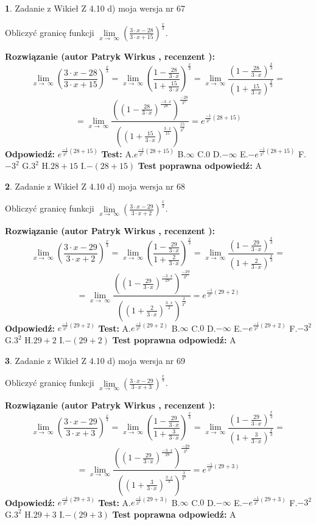 \documentclass[12pt, a4paper]{article}
\theoremstyle{definition} %
\newtheorem{zad}{}
\newcommand{\zadStart}[1]{\begin{zad}#1\newline}
\newcommand{\zadStop}{\end{zad}}
\newcommand{\rozwStart}[2]{\noindent \textbf{Rozwiązanie (autor #1 , recenzent #2): }\newline}
\newcommand{\rozwStop}{\newline}
\newcommand{\odpStart}{\noindent \textbf{Odpowiedź:}\newline}
\newcommand{\odpStop}{\newline}
\newcommand{\testStart}{\noindent \textbf{Test:}\newline}
\newcommand{\testStop}{\newline}
\newcommand{\kluczStart}{\noindent \textbf{Test poprawna odpowiedź:}\newline}
\newcommand{\kluczStop}{\newline}
\begin{document}
\zadStart{Zadanie z Wikieł Z 4.10 d) moja wersja nr 67}


Obliczyć granicę funkcji  $\lim\limits_{x\to\ \infty}(\frac{3\cdot x-28}{3\cdot x+15})^{\frac{x}{3}}$.
\zadStop
\rozwStart{Patryk Wirkus}{}
$$\lim\limits_{x\to\ \infty}(\frac{3\cdot x-28}{3\cdot x+15})^{\frac{x}{3}} = \lim\limits_{x\to\ \infty}(\frac{1-\frac{28}{3\cdot x}}{1+\frac{15}{3\cdot x}})^{\frac{x}{3}}=\lim\limits_{x\to\ \infty}\frac{(1-\frac{28}{3\cdot x})^{\frac{x}{3}}}{(1+\frac{15}{3\cdot x})^{\frac{x}{3}}}=$$
$$=\lim\limits_{x\to\ \infty}\frac{((1-\frac{28}{3\cdot x})^{\frac{-3\cdot x}{28}})^{\frac{-28}{3^{2}}}}{((1+\frac{15}{3\cdot x})^{\frac{3\cdot x}{15}})^{\frac{15}{3^{2}}}}=e^{\frac{-1}{3^{2}}(28+15)}$$
\rozwStop
\odpStart
$e^{\frac{-1}{3^{2}}(28+15)}$
\odpStop
\testStart
A.$e^{\frac{-1}{3^{2}}(28+15)}$ B.$\infty$ C.$0$ D.$-\infty$ E.$-e^{\frac{-1}{3^{2}}(28+15)}$
F.$-3^{2}$ G.$3^{2}$
H.$28+15$
I.$-(28+15)$
\testStop
\kluczStart
A
\kluczStop



\zadStart{Zadanie z Wikieł Z 4.10 d) moja wersja nr 68}


Obliczyć granicę funkcji  $\lim\limits_{x\to\ \infty}(\frac{3\cdot x-29}{3\cdot x+2})^{\frac{x}{3}}$.
\zadStop
\rozwStart{Patryk Wirkus}{}
$$\lim\limits_{x\to\ \infty}(\frac{3\cdot x-29}{3\cdot x+2})^{\frac{x}{3}} = \lim\limits_{x\to\ \infty}(\frac{1-\frac{29}{3\cdot x}}{1+\frac{2}{3\cdot x}})^{\frac{x}{3}}=\lim\limits_{x\to\ \infty}\frac{(1-\frac{29}{3\cdot x})^{\frac{x}{3}}}{(1+\frac{2}{3\cdot x})^{\frac{x}{3}}}=$$
$$=\lim\limits_{x\to\ \infty}\frac{((1-\frac{29}{3\cdot x})^{\frac{-3\cdot x}{29}})^{\frac{-29}{3^{2}}}}{((1+\frac{2}{3\cdot x})^{\frac{3\cdot x}{2}})^{\frac{2}{3^{2}}}}=e^{\frac{-1}{3^{2}}(29+2)}$$
\rozwStop
\odpStart
$e^{\frac{-1}{3^{2}}(29+2)}$
\odpStop
\testStart
A.$e^{\frac{-1}{3^{2}}(29+2)}$ B.$\infty$ C.$0$ D.$-\infty$ E.$-e^{\frac{-1}{3^{2}}(29+2)}$
F.$-3^{2}$ G.$3^{2}$
H.$29+2$
I.$-(29+2)$
\testStop
\kluczStart
A
\kluczStop



\zadStart{Zadanie z Wikieł Z 4.10 d) moja wersja nr 69}


Obliczyć granicę funkcji  $\lim\limits_{x\to\ \infty}(\frac{3\cdot x-29}{3\cdot x+3})^{\frac{x}{3}}$.
\zadStop
\rozwStart{Patryk Wirkus}{}
$$\lim\limits_{x\to\ \infty}(\frac{3\cdot x-29}{3\cdot x+3})^{\frac{x}{3}} = \lim\limits_{x\to\ \infty}(\frac{1-\frac{29}{3\cdot x}}{1+\frac{3}{3\cdot x}})^{\frac{x}{3}}=\lim\limits_{x\to\ \infty}\frac{(1-\frac{29}{3\cdot x})^{\frac{x}{3}}}{(1+\frac{3}{3\cdot x})^{\frac{x}{3}}}=$$
$$=\lim\limits_{x\to\ \infty}\frac{((1-\frac{29}{3\cdot x})^{\frac{-3\cdot x}{29}})^{\frac{-29}{3^{2}}}}{((1+\frac{3}{3\cdot x})^{\frac{3\cdot x}{3}})^{\frac{3}{3^{2}}}}=e^{\frac{-1}{3^{2}}(29+3)}$$
\rozwStop
\odpStart
$e^{\frac{-1}{3^{2}}(29+3)}$
\odpStop
\testStart
A.$e^{\frac{-1}{3^{2}}(29+3)}$ B.$\infty$ C.$0$ D.$-\infty$ E.$-e^{\frac{-1}{3^{2}}(29+3)}$
F.$-3^{2}$ G.$3^{2}$
H.$29+3$
I.$-(29+3)$
\testStop
\kluczStart
A
\kluczStop
\end{document}
